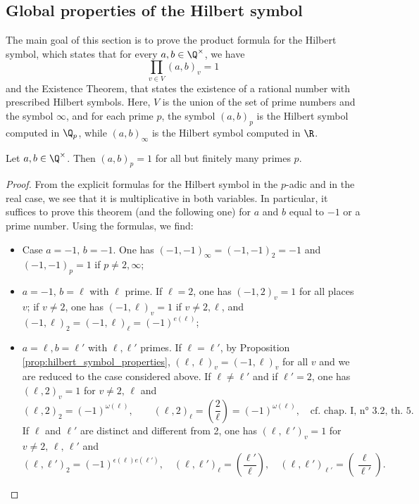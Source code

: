\subsection{Global properties of the Hilbert symbol}
The main goal of this section is to prove
the product formula for the Hilbert symbol, which states that for every $a, b \in \Q^\times$, we have
\[\prod_{v \in V} (a, b)_v = 1\]
and the Existence Theorem, that states the existence of a rational number with prescribed Hilbert symbols.
Here, $V$ is the union of the set of prime numbers and the symbol $\infty$, and for each prime $p$,
the symbol $(a, b)_p$ is the Hilbert symbol computed in $\Q_p$, while $(a, b)_\infty$ is the Hilbert
symbol computed in $\R$.


\begin{theorem}
	\label{thm:almost_all_one}
	\leanok
Let $a, b \in \Q^\times$. Then $(a, b)_p = 1$ for all but finitely many primes $p$.
\end{theorem}

\begin{proof}
	From the explicit formulas for the Hilbert symbol in the $p$-adic and in the real case, we see
	that it is multiplicative in both variables. 	In particular, it suffices to prove this theorem
	(and the following one) for $a$ and $b$ equal to $-1$ or
	a prime number. Using the formulas, we find:
	\begin{itemize}
	\item Case $a = -1, \, b = -1$. One has $(-1, -1)_\infty = (-1, -1)_2 = -1$ and
	$(-1, -1)_p = 1$ if $p \ne 2, \infty$;
  \item $a = -1, \, b = \ell$ with $\ell$ prime. If $\ell=2$, one has $(-1, 2)_v = 1$
	for all places $v$; if $v \ne 2$, one has $(-1, \ell)_v = 1$ if $v \ne 2, \ell$,
	and $(-1, \ell)_2 = (-1, \ell)_{\ell} = (-1)^{e(\ell)}$;
  \item $a = \ell, b = \ell'$ with $\ell, \ell'$ primes. If $\ell = \ell'$, by Proposition
	\ref{prop:hilbert_symbol_properties}, $(\ell, \ell)_v = (-1, \ell)_v$ for all $v$ and we are
	reduced to the case considered above. If $\ell \ne \ell'$ and if $\ell' = 2$, one has
	$(\ell, 2)_v = 1$ for $v \ne 2, \, \ell$ and
\[
(\ell, 2)_2 = (-1)^{\omega(\ell)}, \qquad (\ell, 2)_{\ell} = \left(\frac{2}{\ell}\right) = (-1)^{\omega(\ell)}, \quad \text{cf. chap. I, n° 3.2, th. 5.}
\]
If \( \ell \) and \( \ell' \) are distinct and different from 2, one has \( (\ell, \ell')_v = 1 \) for \( v \neq 2, \, \ell, \, \ell' \) and
\[
(\ell, \ell')_2 = (-1)^{\epsilon(\ell)e(\ell')}, \quad (\ell, \ell')_{\ell} = \left(\frac{\ell'}{\ell}\right), \quad (\ell, \ell')_{\ell'} = \left(\frac{\ell}{\ell'}\right).
\]
\end{itemize}
\end{proof}

